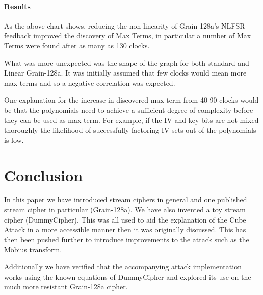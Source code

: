 \documentclass{report}
\let\Oldsubsubsection\subsubsection
\renewcommand{\subsubsection}{\FloatBarrier\Oldsubsubsection}
\begin{document}
\subsubsection{Results}
\begin{figure}[h]
\centering{
\resizebox{150mm}{!}{}
\label{fig:grain_chart}
}
\end{figure}
As the above chart shows, reducing the non-linearity of Grain-128a's NLFSR feedback improved the discovery of Max Terms, in particular a number of Max Terms were found after as many as 130 clocks.

What was more unexpected was the shape of the graph for both standard and Linear Grain-128a. It was initially assumed that few clocks would mean more max terms and so a negative correlation was expected.

One explanation for the increase in discovered max term from 40-90 clocks would be that the polynomials need to achieve a sufficient degree of complexity before   they can be used as max term. For example, if the IV and key bits are not mixed thoroughly the likelihood of successfully factoring IV sets out of the polynomials is low.
\chapter{Conclusion}
In this paper we have introduced stream ciphers in general and one published stream cipher in particular (Grain-128a). We have also invented a toy stream cipher (DummyCipher). This was all used to aid the explanation of the Cube Attack in a more accessible manner then it was originally discussed. This has then been pushed further to introduce improvements to the attack such as the M\"{o}bius transform.

Additionally we have verified that the accompanying attack implementation works using the known equations of DummyCipher and explored its use on the much more resistant Grain-128a cipher.
\end{document}
